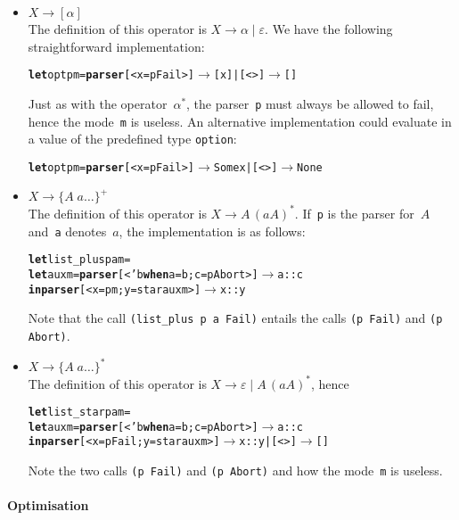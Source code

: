 \begin{itemize}
  \item \(X \rightarrow [\alpha]\)\\
    The definition of this operator is \(X \rightarrow \alpha \mid
    \varepsilon\). We have the following straightforward
    implementation:
\begin{alltt}
\textbf{let} opt p m = \textbf{parser} [< x=p Fail >] \(\rightarrow\) [x] | [<>] \(\rightarrow\) []
\end{alltt}
    Just as with the operator~\(\alpha^*\), the parser~\texttt{p} must
    always be allowed to fail, hence the mode~\texttt{m} is
    useless. An alternative implementation could evaluate in a value
    of the predefined type \texttt{option}:
\begin{alltt}
\textbf{let} opt p m = \textbf{parser} [< x=p Fail >] \!\(\rightarrow\)\! Some x | [<>] \!\(\rightarrow\)\! None
\end{alltt}

  \item \(X \rightarrow \{A \; a \ldots\}^+\)\\
    The definition of this operator is \(X \rightarrow A \, (a
    A)^*\). If~\texttt{p} is the parser for~\(A\) and~\texttt{a}
    denotes~\(a\), the implementation is as follows:
\begin{alltt}
\textbf{let} list\_plus p a m =
  \textbf{let} aux m = \textbf{parser} [< 'b \textbf{when} a=b; c=p Abort >] \(\rightarrow\) a::c
\textbf{in parser} [< x=p m; y=star aux m >] \(\rightarrow\) x::y
\end{alltt}
    Note that the call \texttt{(list\_plus p a Fail)} entails the
    calls \texttt{(p Fail)} and \texttt{(p Abort)}.

  \item \(X \rightarrow \{A \; a \ldots\}^*\)\\
    The definition of this
    operator is \(X \rightarrow \varepsilon \mid A \, (a A)^*\), hence
\begin{alltt}
\textbf{let} list\_star p a m =
  \textbf{let} aux m = \textbf{parser} [< 'b \textbf{when} a=b; c=p Abort >] \(\rightarrow\) a::c
\textbf{in parser} [< x=p Fail; y=star aux m >] \(\rightarrow\) x::y | [<>] \(\rightarrow\) []
\end{alltt}
    Note the two calls \texttt{(p Fail)} and \texttt{(p Abort)} and
    how the mode~\texttt{m} is useless.

\end{itemize}


\paragraph{Optimisation}

